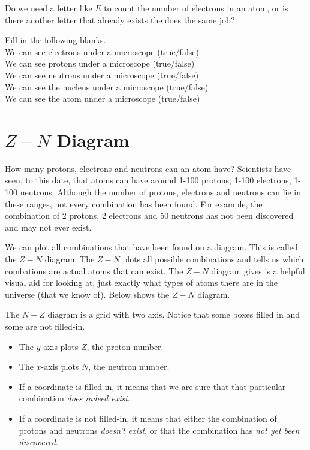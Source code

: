 \frmrule

\begin{example}
Do we need a letter like $E$ to count the number of electrons in an atom, 
or is there another letter that already exists the does the same job?
\end{example}

\frmrule

\begin{example}
Fill in the following blanks. \\
We can see electrons under a microscope (true/false) \\
We can see protons under a microscope (true/false) \\
We can see neutrons under a microscope (true/false) \\
We can see the nucleus under a microscope (true/false) \\
We can see the atom under a microscope (true/false) 
\end{example}

\frmrule



\section{$Z-N$ Diagram}

How many protons, electrons and neutrons can an atom have? 
Scientists have seen, to this date, that atoms can have around 
1-100 protons, 1-100 electrons, 1-100 neutrons. Although the 
number of protons, electrons and neutrons can lie in these 
ranges, not every combination has been found. For example,
the combination of 2 protons, 2 electrons and 50 neutrons 
has not been discovered and may not ever exist. 


We can plot all combinations that have been found 
on a diagram. This is called the $Z-N$ diagram. 
The $Z-N$ plots all possible combinations and tells us 
which combations are actual atoms that can exist.
The $Z-N$ diagram gives is a helpful visual aid for 
looking at, just exactly what types of atoms there are 
in the universe (that we know of). Below shows the $Z-N$ diagram. 

The $N-Z$ diagram is a grid with two axis. Notice that some boxes filled in and 
some are not filled-in.

\begin{itemize}
\item The $y$-axis plots $Z$, the proton number. 
\item The $x$-axis plots $N$, the neutron number. 
\item If a coordinate is filled-in, it means that we are sure that 
that particular combination \textit{does indeed exist}. 
\item If a coordinate is not filled-in, 
it means that either the combination of protons and neutrons
\textit{doesn't exist}, or
that the combination has \textit{not yet been discovered}.
\end{itemize}

